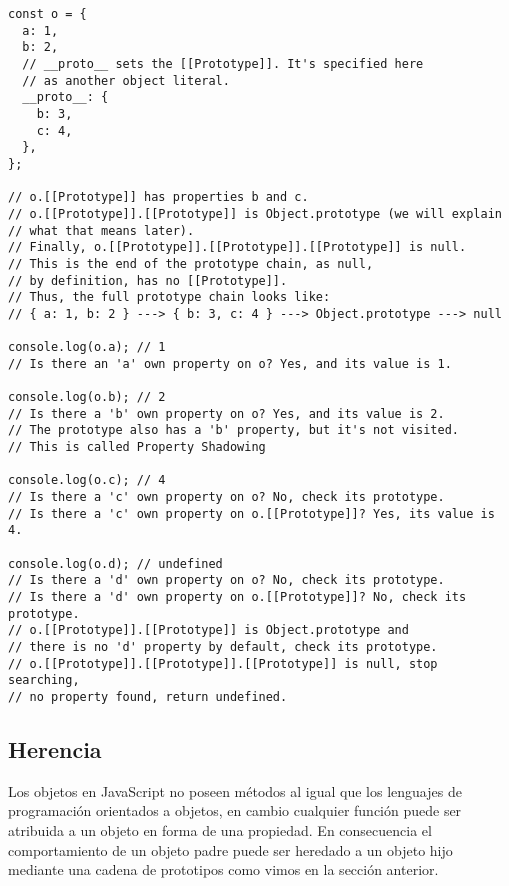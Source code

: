 \documentclass{article}
\begin{document}
\begin{lstlisting}
const o = {
  a: 1,
  b: 2,
  // __proto__ sets the [[Prototype]]. It's specified here
  // as another object literal.
  __proto__: {
    b: 3,
    c: 4,
  },
};

// o.[[Prototype]] has properties b and c.
// o.[[Prototype]].[[Prototype]] is Object.prototype (we will explain
// what that means later).
// Finally, o.[[Prototype]].[[Prototype]].[[Prototype]] is null.
// This is the end of the prototype chain, as null,
// by definition, has no [[Prototype]].
// Thus, the full prototype chain looks like:
// { a: 1, b: 2 } ---> { b: 3, c: 4 } ---> Object.prototype ---> null

console.log(o.a); // 1
// Is there an 'a' own property on o? Yes, and its value is 1.

console.log(o.b); // 2
// Is there a 'b' own property on o? Yes, and its value is 2.
// The prototype also has a 'b' property, but it's not visited.
// This is called Property Shadowing

console.log(o.c); // 4
// Is there a 'c' own property on o? No, check its prototype.
// Is there a 'c' own property on o.[[Prototype]]? Yes, its value is 4.

console.log(o.d); // undefined
// Is there a 'd' own property on o? No, check its prototype.
// Is there a 'd' own property on o.[[Prototype]]? No, check its prototype.
// o.[[Prototype]].[[Prototype]] is Object.prototype and
// there is no 'd' property by default, check its prototype.
// o.[[Prototype]].[[Prototype]].[[Prototype]] is null, stop searching,
// no property found, return undefined.

\end{lstlisting}

\subsection{Herencia}

Los objetos en JavaScript no poseen métodos al igual que los lenguajes de programación orientados  a objetos,
en cambio cualquier función puede ser atribuida a un objeto en forma de una propiedad. En consecuencia el
comportamiento de un objeto padre puede ser heredado a un objeto hijo mediante una cadena de prototipos como vimos
en la sección anterior.
\end{document}

